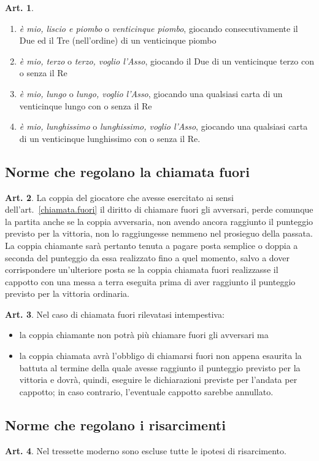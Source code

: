 \documentclass[italian,a4paper]{book}
\theoremstyle{definition}
\newtheorem{art}{Art.}
\newenvironment{packeditem}{
\begin{itemize}
  \setlength{\itemsep}{1pt}
  \setlength{\parskip}{0pt}
  \setlength{\parsep}{0pt}
}{\end{itemize}}
\newenvironment{packedenum}{
\begin{enumerate}
  \setlength{\itemsep}{1pt}
  \setlength{\parskip}{0pt}
  \setlength{\parsep}{0pt}
}{\end{enumerate}}
\begin{document}
\begin{art}
\begin{packedenum}
\item \emph{è mio, liscio e piombo} o \emph{venticinque piombo},  giocando consecutivamente il Due ed il Tre (nell'ordine) di un venticinque piombo
\item \emph{è mio, terzo} o \emph{terzo, voglio l'Asso},  giocando il Due di un venticinque terzo con o senza il Re
\item \emph{è mio, lungo} o \emph{lungo, voglio l'Asso},  giocando una qualsiasi carta di un venticinque lungo con o senza il Re
\item \emph{è mio, lunghissimo} o \emph{lunghissimo, voglio l'Asso},  giocando una qualsiasi carta di un venticinque lunghissimo con o senza il Re.
\end{packedenum}
\end{art}
\subsection{Norme che regolano la chiamata fuori}
\begin{art}
La coppia del giocatore che avesse esercitato ai sensi
dell'art.~\ref{chiamata.fuori} il diritto di chiamare fuori gli avversari, perde comunque la partita anche se la coppia avversaria, non avendo ancora raggiunto il punteggio previsto per la vittoria, non lo raggiungesse nemmeno nel prosieguo della passata.
La coppia chiamante sarà pertanto tenuta a pagare posta semplice o doppia a seconda del punteggio da essa realizzato fino a quel momento, salvo a dover corrispondere un'ulteriore posta se la coppia chiamata fuori realizzasse il cappotto con una messa a terra eseguita prima di aver raggiunto il punteggio previsto per la vittoria ordinaria.
\end{art}
\begin{art}
Nel caso di chiamata fuori rilevatasi intempestiva:
\begin{packeditem}
\item    la coppia chiamante non potrà più chiamare fuori gli avversari ma
\item    la coppia chiamata avrà l'obbligo di chiamarsi fuori non appena esaurita la battuta al termine della quale avesse raggiunto il punteggio previsto per la vittoria e dovrà, quindi, eseguire le  dichiarazioni  previste per l'andata per cappotto; in caso contrario, l'eventuale cappotto sarebbe annullato.
    \end{packeditem}
\end{art}
\subsection{Norme che regolano i risarcimenti}
\begin{art}
Nel tressette moderno sono escluse tutte le ipotesi di risarcimento.
\end{art}
\end{document}
